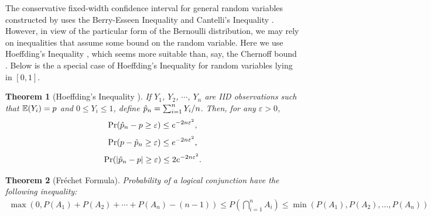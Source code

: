 \documentclass{iitthesis}
\newtheorem{theorem}{Theorem}[section]
\begin{document}
The conservative fixed-width confidence interval for general random variables constructed by  \cite{HJLO12} uses the Berry-Esseen Inequality \cite[Section 4.1]{LB10} and Cantelli's Inequality \cite[Section 6.1]{LB10}. However, in view of the particular form of the Bernoulli distribution, we may rely on inequalities that assume some bound on the random variable.  Here we use Hoeffding's Inequality \cite{H63}, which seems more suitable than, say, the Chernoff bound \cite{chernoff52}.  Below is the a special case of Hoeffding's Inequality for random variables lying in $[0,1]$.
\begin{theorem}[Hoeffding's Inequality {\cite{H63}}] \label{hoeff}
If $Y_1$, $Y_2$, $\cdots$, $Y_n$ are IID observations such that $\mathbb{E}(Y_i)=p$ and $0 \leq Y_i \leq 1$, define $\hat{p}_n=\sum_{i=1}^n Y_i/n$. Then, for any $\varepsilon>0$, 
$$\Pr(\hat{p}_n-p \geq \varepsilon) \leq e^{-2n\varepsilon^2},$$
$$\Pr(p-\hat{p}_n \geq \varepsilon) \leq e^{-2n\varepsilon^2},$$
$$\Pr(\left \lvert \hat{p}_n-p \right \rvert \geq \varepsilon) \leq 2e^{-2n\varepsilon^2}.$$
\end{theorem}
 
\begin{theorem}[Fr\'{e}chet Formula] \cite{Frechet35}
Probability of a logical conjunction have the following inequality:
\begin{align}
\max(0, P(A_1) + P(A_2)+\cdots +P(A_n)-(n -1)) \leq P\left(\bigcap_{i=1}^n A_i\right)\leq \min(P(A_1), P(A_2), ..., P(A_n))
\end{align}
\end{theorem}
\end{document}
